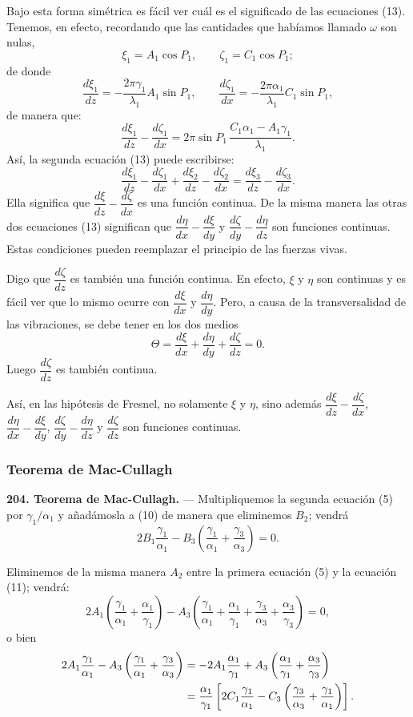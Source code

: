 Bajo esta forma simétrica es fácil ver cuál es el significado de las
ecuaciones (13). Tenemos, en efecto, recordando que las cantidades que
habíamos llamado $\omega$ son nulas,
\[
\xi_1=A_1\cos P_1,\qquad \zeta_1=C_1\cos P_1;
\]
de donde
\[
\frac{d\xi_1}{dz}=-\frac{2\pi\gamma_1}{\lambda_1}A_1\sin P_1,
\qquad
\frac{d\zeta_1}{dx}=-\frac{2\pi\alpha_1}{\lambda_1}C_1\sin P_1,
\]
de manera que:
\[
\frac{d\xi_1}{dz}-\frac{d\zeta_1}{dx}=2\pi\sin P_1\,\frac{C_1\alpha_1-A_1\gamma_1}{\lambda_1}.
\]
Así, la segunda ecuación (13) puede escribirse:
\[
\frac{d\xi_1}{dz}-\frac{d\zeta_1}{dx}+\frac{d\xi_2}{dz}-\frac{d\zeta_2}{dx}
=\frac{d\xi_3}{dz}-\frac{d\zeta_3}{dx}.
\]
Ella significa que $\dfrac{d\xi}{dz}-\dfrac{d\zeta}{dx}$ es una función
continua. De la misma manera las otras dos ecuaciones (13) significan que
$\dfrac{d\eta}{dx}-\dfrac{d\xi}{dy}$ y $\dfrac{d\zeta}{dy}-\dfrac{d\eta}{dz}$
son funciones continuas. Estas condiciones pueden reemplazar el principio
de las fuerzas vivas.

Digo que $\dfrac{d\zeta}{dz}$ es también una función continua. En efecto,
$\xi$ y $\eta$ son continuas y es fácil ver que lo mismo ocurre con
$\dfrac{d\xi}{dx}$ y $\dfrac{d\eta}{dy}$. Pero, a causa de la
transversalidad de las vibraciones, se debe tener en los dos medios
\[
\Theta=\frac{d\xi}{dx}+\frac{d\eta}{dy}+\frac{d\zeta}{dz}=0.
\]
Luego $\dfrac{d\zeta}{dz}$ es también continua.

Así, en las hipótesis de Fresnel, no solamente $\xi$ y $\eta$, sino además
$\dfrac{d\xi}{dz}-\dfrac{d\zeta}{dx}$, $\dfrac{d\eta}{dx}-\dfrac{d\xi}{dy}$,
$\dfrac{d\zeta}{dy}-\dfrac{d\eta}{dz}$ y $\dfrac{d\zeta}{dz}$ son funciones
continuas.

\subsubsection{Teorema de Mac-Cullagh}

\noindent\textbf{204. Teorema de Mac-Cullagh.} — Multipliquemos la segunda
ecuación (5) por $\gamma_1/\alpha_1$ y añadámosla a (10) de manera que
eliminemos $B_2$; vendrá
\begin{equation}
2B_1\frac{\gamma_1}{\alpha_1}-B_3\left(\frac{\gamma_1}{\alpha_1}+\frac{\gamma_3}{\alpha_3}\right)=0.
\end{equation}

Eliminemos de la misma manera $A_2$ entre la primera ecuación (5) y la
ecuación (11); vendrá:
\[
2A_1\left(\frac{\gamma_1}{\alpha_1}+\frac{\alpha_1}{\gamma_1}\right)
-A_3\left(\frac{\gamma_1}{\alpha_1}+\frac{\alpha_1}{\gamma_1}
+\frac{\gamma_3}{\alpha_3}+\frac{\alpha_3}{\gamma_3}\right)=0,
\]
o bien
\begin{align}
2A_1\frac{\gamma_1}{\alpha_1}-A_3\left(\frac{\gamma_1}{\alpha_1}+\frac{\gamma_3}{\alpha_3}\right)
&=-2A_1\frac{\alpha_1}{\gamma_1}+A_3\left(\frac{\alpha_1}{\gamma_1}+\frac{\alpha_3}{\gamma_3}\right)
\notag\\
&=\frac{\alpha_1}{\gamma_1}\left[2C_1\frac{\gamma_1}{\alpha_1}-C_3\left(\frac{\gamma_3}{\alpha_3}+\frac{\gamma_1}{\alpha_1}\right)\right].
\end{align}


